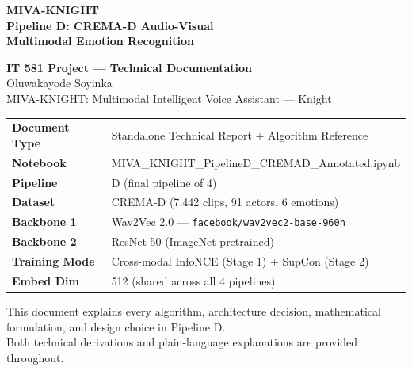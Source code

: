 \documentclass[12pt,a4paper]{article}
\theoremstyle{definition}
\theoremstyle{remark}
\begin{document}
\begin{titlepage}
\centering
\vspace*{2cm}

{\Huge\bfseries\color{cDark} MIVA-KNIGHT}\\[0.4cm]
{\Large\bfseries Pipeline D: CREMA-D Audio-Visual\\[0.2cm]
Multimodal Emotion Recognition}\\[1cm]


\vspace{1.5cm}

{\large\bfseries IT 581 Project — Technical Documentation}\\[0.3cm]
{\large Oluwakayode Soyinka}\\[0.2cm]
{\normalsize MIVA-KNIGHT: Multimodal Intelligent Voice Assistant — Knight}\\[1.0cm]

\begin{tabular}{ll}
\toprule
\textbf{Document Type}  & Standalone Technical Report + Algorithm Reference \\
\textbf{Notebook}       & MIVA\_KNIGHT\_PipelineD\_CREMAD\_Annotated.ipynb \\
\textbf{Pipeline}       & D (final pipeline of 4) \\
\textbf{Dataset}        & CREMA-D (7,442 clips, 91 actors, 6 emotions) \\
\textbf{Backbone 1}     & Wav2Vec 2.0 — \texttt{facebook/wav2vec2-base-960h} \\
\textbf{Backbone 2}     & ResNet-50 (ImageNet pretrained) \\
\textbf{Training Mode}  & Cross-modal InfoNCE (Stage 1) + SupCon (Stage 2) \\
\textbf{Embed Dim}      & 512 (shared across all 4 pipelines) \\
\bottomrule
\end{tabular}

\vfill
{\small\color{gray} This document explains every algorithm, architecture decision,
mathematical formulation, and design choice in Pipeline D.\\
Both technical derivations and plain-language explanations are provided throughout.}
\end{titlepage}
\end{document}
